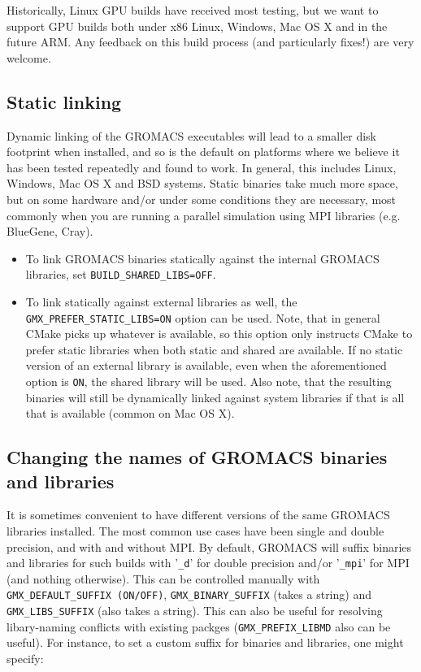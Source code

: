 \documentclass{article}[12pt,a4paper,twoside]
\newcommand{\gromacs}{GROMACS}
\newcommand{\mpi}{MPI}
\newcommand{\cmake}{CMake}
\begin{document}
Historically, Linux GPU builds have received most testing, but we want
to support GPU builds both under x86 Linux, Windows, Mac OS X and in
the future ARM. Any feedback on this build process (and particularly
fixes!) are very welcome.

\subsection{Static linking}
Dynamic linking of the \gromacs{} executables will lead to a
smaller disk footprint when installed, and so is the default on
platforms where we believe it has been tested repeatedly and found to work.
In general, this includes Linux, Windows, Mac OS X and BSD systems.
Static binaries take much more space, but on some hardware and/or under
some conditions they are necessary, most commonly when you are running a parallel
simulation using MPI libraries (e.g. BlueGene, Cray).

\begin{itemize}
\item To link \gromacs{} binaries
statically against the internal \gromacs{} libraries, set
\verb+BUILD_SHARED_LIBS=OFF+.
\item To link statically against external
libraries as well, the \verb+GMX_PREFER_STATIC_LIBS=ON+ option can be
used. Note, that in general \cmake{} picks up whatever is available,
so this option only instructs \cmake{} to prefer static libraries when
both static and shared are available. If no static version of an
external library is available, even when the aforementioned option is
\verb+ON+, the shared library will be used. Also note, that the resulting
binaries will still be dynamically linked against system libraries if
that is all that is available (common on Mac OS X).
\end{itemize}

\subsection{Changing the names of GROMACS binaries and libraries}
It is sometimes convenient to have different versions of the same
\gromacs{} libraries installed. The most common use cases have been
single and double precision, and with and without \mpi{}. By default,
\gromacs{} will suffix binaries and libraries for such builds with
'\verb+_d+' for double precision and/or '\verb+_mpi+' for \mpi{} (and
nothing otherwise). This can be controlled manually with
\verb+GMX_DEFAULT_SUFFIX (ON/OFF)+, \verb+GMX_BINARY_SUFFIX+ (takes 
a string) and \verb+GMX_LIBS_SUFFIX+ (also takes a string). 
This can also be useful for resolving libary-naming conflicts with 
existing packges (\verb+GMX_PREFIX_LIBMD+ also can be useful).
For instance, to set a custom suffix for binaries and libraries, 
one might specify:
\end{document}
